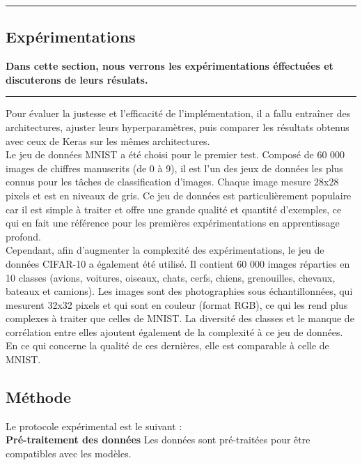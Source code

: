 {\color{gray}\hrule}
\begin{center}
\section{Expérimentations}
\textbf{Dans cette section, nous verrons les expérimentations éffectuées et discuterons de leurs résulats.}
\bigskip
\end{center}
{\color{gray}\hrule}
\begin{multicols}{2}

Pour évaluer la justesse et l’efficacité de l’implémentation, il a fallu entraîner 
des architectures, ajuster leurs hyperparamètres, puis comparer les résultats obtenus avec 
ceux de Keras sur les mêmes architectures. \\

Le jeu de données MNIST a été choisi pour le premier test. Composé de 
60 000 images de chiffres manuscrits (de 0 à 9), il est l’un des jeux de données 
les plus connus pour les tâches de classification d’images. Chaque image mesure 
28x28 pixels et est en niveaux de gris. Ce jeu de données est particulièrement
populaire car il est simple à traiter et offre une grande qualité et quantité 
d’exemples, ce qui en fait une référence pour les premières expérimentations en 
apprentissage profond. \\

Cependant, afin d’augmenter la complexité des expérimentations, le jeu de données CIFAR-10\cite{CIFAR10} a également 
été utilisé. Il contient 60 000 images réparties en 10 classes (avions, voitures, oiseaux, chats, cerfs, 
chiens, grenouilles, chevaux, bateaux et camions). Les images sont des photographies sous échantillonnées, qui mesurent 32x32 pixels et qui sont en couleur 
(format RGB), ce qui les rend plus complexes à traiter que celles de MNIST. La diversité des classes et le manque de corrélation 
entre elles ajoutent également de la complexité à ce jeu de données. En ce qui concerne la qualité de ces dernières,
elle est comparable à celle de MNIST.

\subsection{Méthode}

Le protocole expérimental est le suivant :  \\


\textbf{Pré-traitement des données} Les données sont pré-traitées 
pour être compatibles avec les modèles.\\


\end{multicols}
